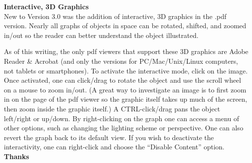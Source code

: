 \thispagestyle{empty}
\noindent\textbf{\large Interactive, 3D Graphics}\\

New to Version 3.0 was the addition of interactive, 3D graphics in the .pdf version. Nearly all graphs of objects in space can be rotated, shifted, and zoomed in/out so the reader can better understand the object illustrated. 

As of this writing, the only pdf viewers that support these 3D graphics are Adobe Reader \& Acrobat (and only the versions for PC/Mac/Unix/Linux computers, not tablets or smartphones). To activate the interactive mode, click on the image. Once activated, one can click/drag to rotate the object and use the scroll wheel on a mouse to zoom in/out. (A great way to investigate an image is to first zoom in on the page of the pdf viewer so the graphic itself takes up much of the screen, then zoom inside the graphic itself.) A CTRL-click/drag pans the object left/right or up/down. By right-clicking on the graph one can access a menu of other options, such as changing the lighting scheme or perspective. One can also revert the graph back to its default view. If you wish to deactivate the interactivity, one can right-click and choose the ``Disable Content'' option. \\

\noindent\textbf{\large Thanks}\\

